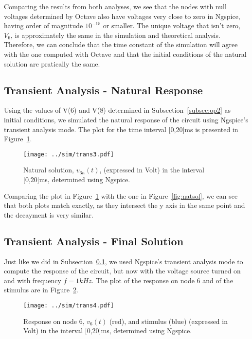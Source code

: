 Comparing the results from both analyses, we see that the nodes with null voltages determined by Octave also have voltages very close to zero in Ngspice, having order of magnitude $10^{-15}$ or smaller. The unique voltage that isn't zero, $V_6$, is approximately the same in the simulation and theoretical analysis. Therefore, we can conclude that the time constant of the simulation will agree with the one computed with Octave and that the initial conditions of the natural solution are pratically the same.

\subsection{Transient Analysis - Natural Response} \label{subsec:trannat}

Using the values of V(6) and V(8) determined in Subsection~\ref{subsec:op2} as initial conditions, we simulated the natural response of the circuit using Ngspice's transient analysis mode. The plot for the time interval [0,20]ms is presented in Figure~\ref{fig:trannat}.

\begin{figure}[H] \centering
\texttt{[image: ../sim/trans3.pdf]}
\caption{Natural solution, $v_{6n}(t)$, (expressed in Volt) in the interval [0,20]ms, determined using Ngspice.}
\label{fig:trannat}
\end{figure}

Comparing the plot in Figure~\ref{fig:trannat} with the one in Figure~\ref{fig:natsol}, we can see that both plots match exactly, as they intersect the y axis in the same point and the decayment is very similar.

\subsection{Transient Analysis - Final Solution} \label{subsec:tranfin}

Just like we did in Subsection~\ref{subsec:trannat}, we used Ngspice's transient analysis mode to compute the response of the circuit, but now with the voltage source turned on and with frequency $f=1kHz$. The plot of the response on node 6 and of the stimulus are in Figure~\ref{fig:trans4}.

\begin{figure}[H] \centering
\texttt{[image: ../sim/trans4.pdf]}
\caption{Response on node 6, $v_{6}(t)$ (red), and stimulus (blue) (expressed in Volt) in the interval [0,20]ms, determined using Ngspice.}
\label{fig:trans4}
\end{figure}

